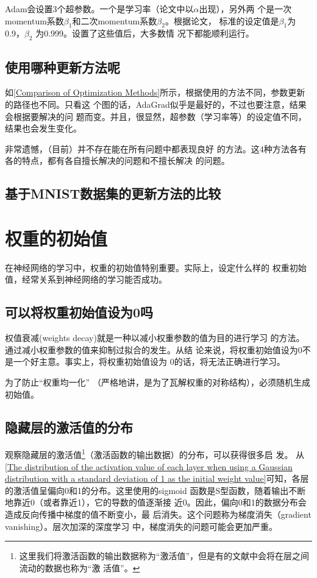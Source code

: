 \begin{tcolorbox}
    Adam会设置3个超参数。一个是学习率（论文中以$\alpha$出现），另外两
    个是一次momentum系数$\beta_1$和二次momentum系数$\beta_2$。根据论文，
    标准的设定值是$\beta_1$为0.9，$\beta_2$ 为0.999。设置了这些值后，大多数情
    况下都能顺利运行。
\end{tcolorbox}
\subsection{使用哪种更新方法呢}

如\autoref{Comparison of Optimization Methods}所示，根据使用的方法不同，参数更新的路径也不同。只看这
个图的话，AdaGrad似乎是最好的，不过也要注意，结果会根据要解决的问
题而变。并且，很显然，超参数（学习率等）的设定值不同，结果也会发生变化。

非常遗憾，（目前）并不存在能在所有问题中都表现良好
的方法。这4种方法各有各的特点，都有各自擅长解决的问题和不擅长解决
的问题。

\subsection{基于MNIST数据集的更新方法的比较}
\section{权重的初始值}
在神经网络的学习中，权重的初始值特别重要。实际上，设定什么样的
权重初始值，经常关系到神经网络的学习能否成功。

\subsection{可以将权重初始值设为0吗}
权值衰减(weights decay)就是一种以减小权重参数的值为目的进行学习
的方法。通过减小权重参数的值来抑制过拟合的发生。从结
论来说，将权重初始值设为0不是一个好主意。事实上，将权重初始值设为
0的话，将无法正确进行学习。

为了防止“权重均一化”
（严格地讲，是为了瓦解权重的对称结构），必须随机生成初始值。
\subsection{隐藏层的激活值的分布}
观察隐藏层的激活值\footnote{这里我们将激活函数的输出数据称为“激活值”，但是有的文献中会将在层之间流动的数据也称为“激
    活值”。}（激活函数的输出数据）的分布，可以获得很多启
发。
从\autoref{The distribution of the activation value of each layer when using a Gaussian distribution with a standard deviation of 1 as the initial weight value}可知，各层的激活值呈偏向0和1的分布。这里使用的sigmoid
函数是S型函数，随着输出不断地靠近0（或者靠近1），它的导数的值逐渐接
近0。因此，偏向0和1的数据分布会造成反向传播中梯度的值不断变小，最
后消失。这个问题称为梯度消失（gradient vanishing）。层次加深的深度学习
中，梯度消失的问题可能会更加严重。

